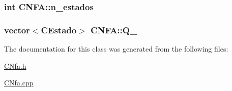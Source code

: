 \subsubsection[{\texorpdfstring{n\+\_\+estados}{n_estados}}]{\setlength{\rightskip}{0pt plus 5cm}int C\+N\+F\+A\+::n\+\_\+estados\hspace{0.3cm}{\ttfamily [private]}}\hypertarget{classCNFA_a887785fdfe01da854067ca5b528da79c}{}\label{classCNFA_a887785fdfe01da854067ca5b528da79c}
\subsubsection[{\texorpdfstring{Q\+\_\+}{Q_}}]{\setlength{\rightskip}{0pt plus 5cm}vector$<${\bf C\+Estado}$>$ C\+N\+F\+A\+::\+Q\+\_\+\hspace{0.3cm}{\ttfamily [private]}}\hypertarget{classCNFA_a28a2f71306cb27d725bad4093c5c82c7}{}\label{classCNFA_a28a2f71306cb27d725bad4093c5c82c7}


The documentation for this class was generated from the following files\+:\begin{DoxyCompactItemize}
\item 
\hyperlink{CNfa_8h}{C\+Nfa.\+h}\item 
\hyperlink{CNfa_8cpp}{C\+Nfa.\+cpp}\end{DoxyCompactItemize}
